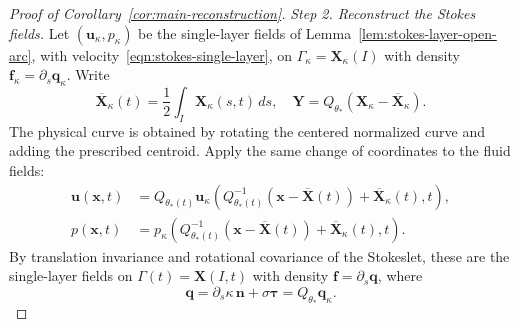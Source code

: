 \documentclass[11pt,reqno]{amsart}
\theoremstyle{plain}
\theoremstyle{definition}
\numberwithin{equation}{section}
\newcommand{\paren}[1]{\left(#1\right)}
\newcommand{\p}{\partial}
\newcommand{\bm}[1]{\boldsymbol{#1}}
\newcommand{\xk}{\bm X_\kappa}
\begin{document}
\begin{proof}[Proof of Corollary~\ref{cor:main-reconstruction}]
\emph{Step 2. Reconstruct the Stokes fields.}
Let $(\bm u_\kappa,p_\kappa)$ be the single-layer fields of Lemma~\ref{lem:stokes-layer-open-arc}, with velocity~\eqref{eqn:stokes-single-layer}, on
$\Gamma_\kappa=\xk(I)$ with density
$\bm f_\kappa=\p_s\bm q_\kappa$.
Write
\begin{equation}
    \overline{\bm X}_\kappa(t)=\frac12\int_I\xk(s,t)\,ds,
    \quad
    \bm Y=Q_{\theta_*}\paren{\xk-\overline{\bm X}_\kappa}.
\end{equation}
The physical curve is obtained by rotating the centered normalized
curve and adding the prescribed centroid. Apply the same change of
coordinates to the fluid fields:
\begin{equation}\label{eqn:reconstructed-fluid}
\begin{aligned}
    \bm u(\bm x,t)
    &=Q_{\theta_*(t)}\bm u_\kappa\!\left(
        Q_{\theta_*(t)}^{-1}
        \paren{\bm x-\overline{\bm X}(t)}
        +\overline{\bm X}_\kappa(t),t\right),\\
    p(\bm x,t)
    &=p_\kappa\!\left(
        Q_{\theta_*(t)}^{-1}
        \paren{\bm x-\overline{\bm X}(t)}
        +\overline{\bm X}_\kappa(t),t\right).
\end{aligned}
\end{equation}
By translation invariance and rotational covariance of the Stokeslet, these
are the single-layer fields on $\Gamma(t)=\bm X(I,t)$ with density
$\bm f=\p_s\bm q$, where
\begin{equation}
    \bm q=\p_s\kappa\,\bm n+\sigma\bm\tau
        =Q_{\theta_*}\bm q_\kappa.
\end{equation}


\end{proof}
\end{document}
